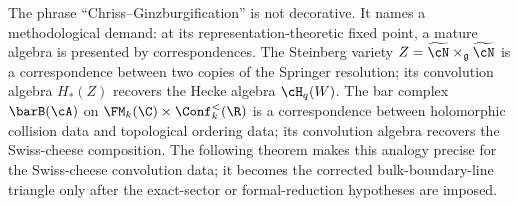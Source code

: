 The phrase ``Chriss--Ginzburgification'' is not decorative.
It names a methodological demand: at its representation-theoretic fixed
point, a mature algebra is presented by correspondences.
The Steinberg variety $Z = \widetilde{\cN} \times_{\mathfrak g}
\widetilde{\cN}$ is a correspondence between two copies of the
Springer resolution; its convolution algebra $H_*(Z)$ recovers the
Hecke algebra $\cH_q(W)$. The bar complex $\barB(\cA)$ on
$\FM_k(\C) \times \Conf_k^{<}(\R)$ is a correspondence between
holomorphic collision data and topological ordering data; its
convolution algebra recovers the Swiss-cheese composition.
The following theorem makes this analogy precise for the Swiss-cheese
convolution data; it becomes the corrected bulk-boundary-line triangle
only after the exact-sector or formal-reduction hypotheses are imposed.

